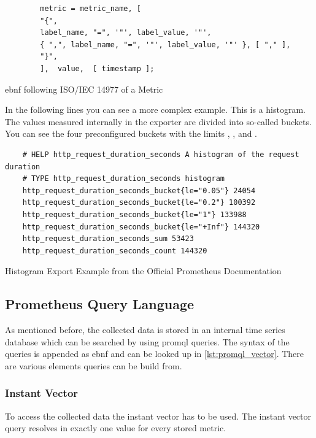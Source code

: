 \begin{listing}[H]
	\begin{samepage}
		\begin{verbatim}
		metric = metric_name, [ 
		"{",
		label_name, "=", '"', label_value, '"',
		{ ",", label_name, "=", '"', label_value, '"' }, [ "," ], 
		"}",
		],  value,  [ timestamp ];
		\end{verbatim}
		\caption{\gls{ebnf} following ISO/IEC 14977 of a Metric}
	\end{samepage}
\end{listing}

In the following lines you can see a more complex example. This is a histogram. The values measured internally in the exporter are divided into so-called buckets. You can see the four preconfigured buckets with the limits , ,  and . 

\begin{listing}[!ht]
	\begin{verbatim}
	# HELP http_request_duration_seconds A histogram of the request duration
	# TYPE http_request_duration_seconds histogram
	http_request_duration_seconds_bucket{le="0.05"} 24054
	http_request_duration_seconds_bucket{le="0.2"} 100392
	http_request_duration_seconds_bucket{le="1"} 133988
	http_request_duration_seconds_bucket{le="+Inf"} 144320
	http_request_duration_seconds_sum 53423
	http_request_duration_seconds_count 144320
	\end{verbatim}
	\caption{Histogram Export Example from the Official Prometheus Documentation~\cite{PrometheusExpositionFormatBeispiel}}
\end{listing}

\subsection{Prometheus Query Language}
\label{subsec:promql}

As mentioned before, the collected data is stored in an internal time series database which can be searched by using \gls{promql} queries.
The syntax of the queries is appended as \gls{ebnf} and can be looked up in \cref{lst:promql_vector}.
There are various elements queries can be build from.

\subsubsection{Instant Vector}

To access the collected data the instant vector has to be used. The instant vector query resolves in exactly one value for every stored metric.

